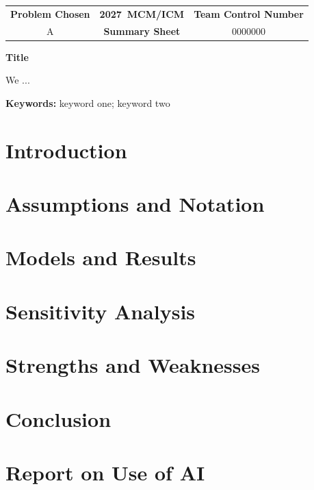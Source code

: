 \documentclass[12pt]{article}
\newcommand{\ContestYear}{2027}
\newcommand{\TeamNumber}{0000000}
\newcommand{\ProblemChosen}{A}
\newcommand{\PaperTitle}{Title}
\begin{document}
\begin{center}
\begin{tabular}{|c|c|c|}
\hline
\textbf{Problem Chosen} & \textbf{\ContestYear\ MCM/ICM} & \textbf{Team Control Number}\\
\ProblemChosen & \textbf{Summary Sheet} & \TeamNumber\\
\hline
\end{tabular}

\medskip
{\Large\bfseries \PaperTitle}
\end{center}
We ...

\medskip
\noindent\textbf{Keywords:} keyword one; keyword two
\clearpage

\tableofcontents
\clearpage

\section{Introduction}
\section{Assumptions and Notation}
\section{Models and Results}
\section{Sensitivity Analysis}
\section{Strengths and Weaknesses}
\section{Conclusion}

% 
% 

\label{SolutionLastPage}

\clearpage
{}
\section*{Report on Use of AI}
\end{document}
